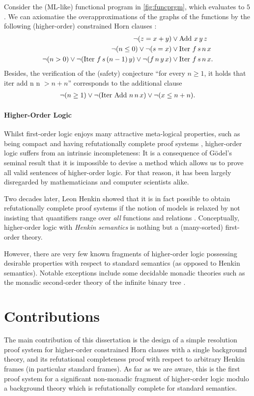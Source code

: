 \documentclass[a4paper,twoside,notitlepage,openright,11pt]{report}
\begin{document}
Consider the (ML-like) functional program in \cref{fig:funcprgm}, which evaluates to $5$. We can axiomatise the overapproximations of the graphs of the functions by the following (higher-order) constrained Horn clauses \cite{BOR18}:
\begin{align*}
  \neg(z=x+y)&\lor \operatorname{Add}\,x\,y\,z\\
  \neg(n\leq 0)\lor\neg (s=x) &\lor \operatorname{Iter}\,f\,s\,n\,x\\
  \neg(n>0)\lor\neg (\operatorname{Iter}\,f\,s\,(n-1)\,y)\lor\neg(f\,n\,y\,x) &\lor \operatorname{Iter}\,f\,s\,n\,x.
\end{align*}
Besides, the verification of the (safety) conjecture
  ``for every $n\geq 1$, it holds that iter add n n $> n+n$''
corresponds to the additional clause
\begin{align*}
  \neg (n\geq 1)\lor\neg(\operatorname{Iter}\,\operatorname{Add}\,n\,n\,x)\lor\neg(x\leq n+n).
\end{align*}

\paragraph{Higher-Order Logic} Whilst first-order logic enjoys many attractive meta-logical properties, such as being compact and having refutationally complete proof systems \cite{G29}, higher-order logic suffers from an intrinsic incompleteness: It is a consequence of G\"odel's seminal result \cite{G31} that it is impossible to devise a method which allows us to prove all valid sentences of higher-order logic. For that reason, it has been largely disregarded by mathematicians and computer scientists alike.

Two decades later, Leon Henkin showed that it is in fact possible to obtain refutationally complete proof systems if the notion of models is relaxed by not insisting that quantifiers range over \emph{all} functions and relations \cite{H50}. Conceptually, higher-order logic with \emph{Henkin semantics} is nothing but a (many-sorted) first-order theory.

However, there are very few known fragments of higher-order logic possessing desirable properties with respect to standard semantics (as opposed to Henkin semantics). Notable exceptions include some decidable monadic theories such as the monadic second-order theory of the infinite binary tree \cite{R69}.

\section{Contributions}
The main contribution of this dissertation is the design of a simple resolution proof system for higher-order constrained Horn clauses with a single background theory, and its refutational completeness proof with respect to arbitrary Henkin frames (in particular standard frames). As far as we are aware, this is the first proof system for a significant non-monadic fragment of higher-order logic modulo a background theory which is refutationally complete for standard semantics.
\end{document}
